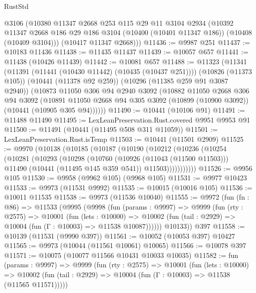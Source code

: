 \begin{lexlean}{RustStd}
\begin{coremodule}
      @3106
      (@10380
        @11347
        @2668
        @253
        @115
        @29
        @11
        @3104
        @2934
        (@10392
          @11347
          @2668
          @186
          @29
          @186
          @3104
          (@10400 (@10401 @11347 @186))
          (@10408 (@10409 @3104)))
        (@10417 @11347 @2668)))
@11436 := @9987 @251
@11437 := @10183 @11436
@11438 := @11435 @11437
@11439 := @10057 @657
@11441 := @11438 (@10426 @11439)
@11442 := @10081 @657
@11488 := @11323
    (@11341
      (@11391 (@11441 (@10430 @11442) (@10435 (@10437 @251))))
      (@10826 (@11373 @105))
      (@10441 (@11378 @92 @259))
      (@10296 (@11385 @259 @91 @3087 @2940))
      (@10873
        @11050
        @306
        @94
        @2940
        @3092
        (@10882
          @11050
          @2668
          @306
          @94
          @3092
          (@10891 @11050 @2668 @94 @305 @3092 (@10899 (@10900 @3092)) (@10441 (@10905 @305 @94))))))
@11490 := @10441 (@10106 @91)
@11491 := @11488 @11490
@11495 := LexLeanPreservation.Rust.covered @9951 @9953 @91
@11500 := @11491 (@10441 (@11495 @508 @311 @11059))
@11501 := LexLeanPreservation.Rust.isTemp
@11503 := @10441 (@11501 @2909)
@11525 := @9970
    (@10138
      (@10185
        (@10187
          (@10190
            (@10212
              (@10236
                (@10254
                  (@10281
                    (@10293
                      (@10298
                        (@10760
                          (@10926 (@11043 (@11500 @11503)))
                          @11490
                          (@10441 (@11495 @145 @359 @541))
                          @11503)))))))))))
@11526 := @9956 @105
@11530 := @9958 (@9962 @105) (@9968 @105)
@11531 := @9977 @10423
@11533 := @9973 (@11531 @9992)
@11535 := @10015 (@10016 @105)
@11536 := @10011 @11535
@11538 := @9973 (@11536 @10040)
@11555 := @9972
    (fun (fn : @86) =>
    @11533
      (@9995
        (@9998
          (fun (params : @9997) =>
          @9999
            (fun (rty : @2575) =>
            @10001
              (fun (lets : @10000) =>
              @10002 (fun (tail : @2929) => @10004 (fun (Γ : @10003) => @11538 @10087))))))
        @10133))
    @397
@11558 := @10139 (@11531 (@9990 @397))
@11561 := @10052 (@10053 @397) @10427
@11565 := @9973 (@10044 (@11561 @10061) @10065)
@11566 := @10078 @397
@11571 := @10075 (@10077 @11566 @10431 @10033 @10035)
@11582 := fun (params : @9997) =>
  @9999
    (fun (rty : @2575) =>
    @10001
      (fun (lets : @10000) =>
      @10002 (fun (tail : @2929) => @10004 (fun (Γ : @10003) => @11538 (@11565 @11571)))))

\end{coremodule}
\end{lexlean}

